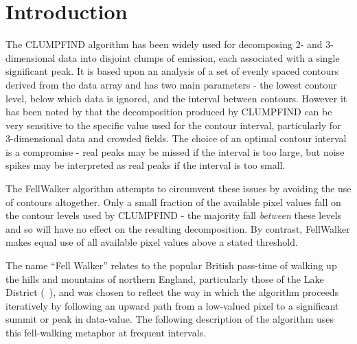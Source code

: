 \documentclass[final,authoryear,5p,times,twocolumn]{elsarticle}
\begin{document}

\newcommand{\mnras}{Mon Not R Astron Soc}
\newcommand{\aap}{Astron Astrophys}
\newcommand{\aaps}{Astron Astrophys Supp}
\newcommand{\pasp}{Pub Astron Soc Pacific}
\newcommand{\apj}{Astrophys J}
\newcommand{\apjs}{Astrophys J Supp}
\newcommand{\qjras}{Quart J R Astron Soc}
\newcommand{\an}{Astron.\ Nach.}
\newcommand{\ijimw}{Int.\ J.\ Infrared \& Millimeter Waves}
\newcommand{\procspie}{Proc.\ SPIE}
\newcommand{\aspconf}{ASP Conf. Ser.}

\newcommand{\ascl}[1]{\href{http://www.ascl.net/#1}{ascl:#1}}

\section{Introduction}
\label{sec:intro}

The CLUMPFIND algorithm \citep[][\ascl{1107.014}]{1994Williams} has been widely used for
decomposing 2- and 3-dimensional data into disjoint clumps of emission,
each associated with a single significant peak. It is based upon an
analysis of a set of evenly spaced contours derived from the data array
and has two main parameters - the lowest contour level, below which
data is ignored, and the interval between contours. However it has been
noted by \cite{2009Pineda} that the decomposition produced by CLUMPFIND
can be very sensitive to the specific value used for the contour interval,
particularly for 3-dimensional data and crowded fields. The choice of an
optimal contour interval is a compromise - real peaks may be missed if
the interval is too large, but noise spikes may be interpreted as real
peaks if the interval is too small.

The FellWalker algorithm attempts to circumvent these issues by avoiding
the use of contours altogether. Only a small fraction of the available
pixel values fall on the contour levels used by CLUMPFIND - the majority
fall \emph{between} these levels and so will have no effect on the
resulting decomposition. By contrast, FellWalker makes equal use of all
available pixel values above a stated threshold.

The name ``Fell Walker'' relates to the popular British pass-time of
walking up the hills and mountains of northern England, particularly
those of the Lake District
(~), and was
chosen to reflect the way in which the algorithm proceeds iteratively by
following an upward path from a low-valued pixel to a significant summit
or peak in data-value. The following description of the algorithm uses
this fell-walking metaphor at frequent intervals.
\end{document}
